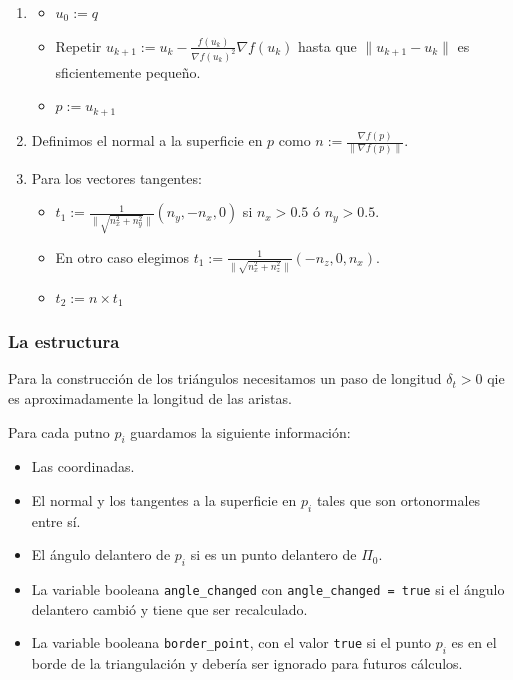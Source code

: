 \begin{enumerate}
	\item \begin{itemize}
		\item $u_0 := q$
		\item Repetir $u_{k+1} := u_k - \frac{f(u_k)}{\nabla f(u_k)^2} \nabla f(u_k)$ hasta que $\| u_{k+1} - u_k \|$ es sficientemente pequeño.
		\item $p := u_{k+1}$ 
\end{itemize}		
	\item Definimos el normal a la superficie en $p$ como $n := \frac{\nabla f(p)}{\| \nabla f(p) \|}$.
	\item Para los vectores tangentes: \begin{itemize}
		\item $t_1 := \frac{1}{\| \sqrt{n_x^2 + n_y^2} \|} (n_y, -n_x, 0)$ si $n_x > 0.5$ ó $n_y > 0.5$.
		\item En otro caso elegimos $t_1 := \frac{1}{\| \sqrt{n_x^2 + n_z^2} \|} (-n_z, 0, n_x)$.
		\item $t_2 := n \times t_1$
	\end{itemize}
\end{enumerate}

\subsubsection{La estructura}

Para la construcción de los triángulos necesitamos un paso de longitud $\delta_t > 0$ qie es aproximadamente la longitud de las aristas.
\par Para cada putno $p_i$ guardamos la siguiente información:
\begin{itemize}
	\item Las coordinadas.
	\item El normal y los tangentes a la superficie en $p_i$ tales que son ortonormales entre sí.
	\item El ángulo delantero de $p_i$ si es un punto delantero de $\Pi_0$.
	\item La variable booleana \texttt{angle\_changed} con \texttt{angle\_changed = true} si el ángulo delantero cambió y tiene que ser recalculado.
	\item La variable booleana \texttt{border\_point}, con el valor \texttt{true} si el punto $p_i$ es en el borde de la triangulación y debería ser ignorado para futuros cálculos.
\end{itemize}

